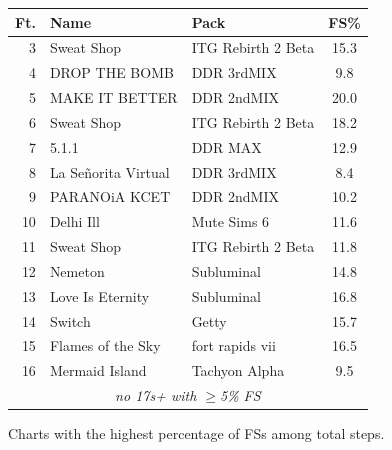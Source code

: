 \documentclass[10pt]{sigplanconf}
\begin{document}
\begin{figure}[t]
	\begin{center}
		\small
	\begin{tabular}{r|l|l|c}
		\bf Ft. & \bf Name & \bf Pack & \bf FS\% \\
		\hline
		 3 & Sweat Shop       & ITG Rebirth 2 Beta    & 15.3 \\
		 4 & DROP THE BOMB    & DDR 3rdMIX            &  9.8 \\
		 5 & MAKE IT BETTER   & DDR 2ndMIX            & 20.0 \\
		 6 & Sweat Shop       & ITG Rebirth 2 Beta    & 18.2 \\
		 7 & 5.1.1            & DDR MAX               & 12.9 \\
		 8 & La Se\~{n}orita Virtual & DDR 3rdMIX     &  8.4 \\
		 9 & PARANOiA KCET    & DDR 2ndMIX            & 10.2 \\
		10 & Delhi Ill        & Mute Sims 6           & 11.6 \\
		11 & Sweat Shop       & ITG Rebirth 2 Beta    & 11.8 \\
		12 & Nemeton          & Subluminal            & 14.8 \\
		13 & Love Is Eternity & Subluminal            & 16.8 \\
		14 & Switch           & Getty                 & 15.7 \\
		15 & Flames of the Sky & fort rapids vii      & 16.5 \\
		16 & Mermaid Island   & Tachyon Alpha         &  9.5 \\
		\multicolumn{4}{c}{\em no 17s+ with $\ge$5\% FS} \\
	\end{tabular}
	\end{center}
	\caption{Charts with the highest percentage of FSs among total steps.}
\end{figure}
\end{document}
